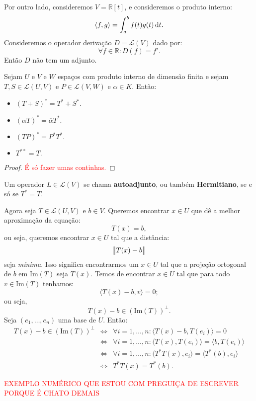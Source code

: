 \documentclass[11pt,twoside,a4paper]{book}
\begin{document}
\begin{observacao}
Por outro lado, consideremos $V=\mathbb{R}[t]$, e consideremos o produto interno:
\[
\langle f,g\rangle=\int_a^bf(t)g(t)\dif t.
\]
Consideremos o operador derivação $D=\mathcal{L}(V)$ dado por:
\[
\forall f\in\mathbb{R}:D(f)=f'.
\]
Então $D$ não tem um adjunto.
\end{observacao}

\begin{proposicao}
Sejam $U$ e $V$ e $W$ espaços com produto interno de dimensão finita e sejam $T,S\in\mathcal{L}(U,V)$ e $P\in\mathcal{L}(V,W)$ e $\alpha\in K$. Então:
\begin{itemize}
\item $(T+S)^*=T^*+S^*.$
\item $(\alpha T)^*=\overline{\alpha}T^*.$
\item $(TP)^*=P^*T^*.$
\item $T^{**}=T.$
\end{itemize}
\end{proposicao}
\begin{proof}
\textcolor{red}{É só fazer umas continhas.}
\end{proof}

\begin{definicao}
Um operador $L\in\mathcal{L}(V)$ se chama \textbf{autoadjunto}, ou também \textbf{Hermitiano}, se e só se $T^*=T.$
\end{definicao}

\noindent
Agora seja $T\in\mathcal{L}(U,V)$ e $b\in V$. Queremos encontrar $x\in U$ que dê a melhor aproximação da equação:
\[
T(x)=b,
\]
ou seja, queremos encontrar $x\in U$ tal que a distância:
\[
\norm{T(x)-b}
\]
seja \emph{mínima}. Isso significa encontrarmos um $x\in U$ tal que a projeção ortogonal de $b$ em $\mathrm{Im}(T)$ seja $T(x)$. Temos de encontrar $x\in U$ tal que para todo $v\in\mathrm{Im}(T)$ tenhamos:
\[
\langle T(x)-b,v\rangle=0;
\]
ou seja,
\[
T(x)-b\in(\mathrm{Im}(T))^\perp.
\]
Seja $(e_1,\dots,e_n)$ uma base de $U$. Então:
\[
\begin{array}{rcl}
T(x)-b\in(\mathrm{Im}(T))^\perp&\Leftrightarrow&\forall i=1,\dots,n:\langle T(x)-b,T(e_i)\rangle=0\\
&\Leftrightarrow&\forall i=1,\dots,n:\langle T(x),T(e_i)\rangle=\langle b,T(e_i)\rangle\\
&\Leftrightarrow&\forall i=1,\dots,n:\langle T^*T(x),e_i\rangle=\langle T^*(b),e_i\rangle\\
&\Leftrightarrow& T^*T(x)=T^*(b).
\end{array}
\]

\medskip
\noindent
\textcolor{red}{EXEMPLO NUMÉRICO QUE ESTOU COM PREGUIÇA DE ESCREVER PORQUE É CHATO DEMAIS}

\printindex
\end{document}
